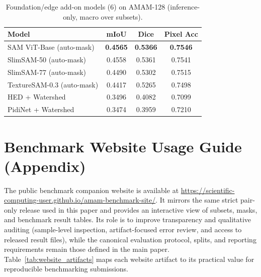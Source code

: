 \documentclass{article}
\newcommand{\datasetname}{AMAM-128}
\newcommand{\tablefontsize}{\small}
\begin{document}
\begin{table}[ht]
    \centering
    \tablefontsize
    \caption{Foundation/edge add-on models (6) on \datasetname{} (inference-only, macro over subsets).}
    \label{tab:foundation-edge}
    \begin{tabular}{lccc}
        \toprule
        Model & mIoU & Dice & Pixel Acc \\
        \midrule
        SAM ViT-Base (auto-mask) & \textbf{0.4565} & \textbf{0.5366} & \textbf{0.7546} \\
        SlimSAM-50 (auto-mask) & 0.4558 & 0.5361 & 0.7541 \\
        SlimSAM-77 (auto-mask) & 0.4490 & 0.5302 & 0.7515 \\
        TextureSAM-0.3 (auto-mask) & 0.4417 & 0.5265 & 0.7498 \\
        HED + Watershed & 0.3496 & 0.4082 & 0.7099 \\
        PidiNet + Watershed & 0.3474 & 0.3959 & 0.7210 \\
        \bottomrule
    \end{tabular}
\end{table}

\section{Benchmark Website Usage Guide (Appendix)}
The public benchmark companion website is available at \url{https://scientific-computing-user.github.io/amam-benchmark-site/}. It mirrors the same strict pair-only release used in this paper and provides an interactive view of subsets, masks, and benchmark result tables. Its role is to improve transparency and qualitative auditing (sample-level inspection, artifact-focused error review, and access to released result files), while the canonical evaluation protocol, splits, and reporting requirements remain those defined in the main paper. Table~\ref{tab:website_artifacts} maps each website artifact to its practical value for reproducible benchmarking submissions.
\end{document}
